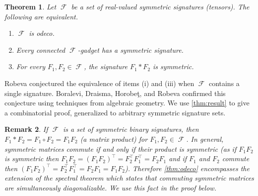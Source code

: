 \documentclass{article}
\newtheorem{theorem}{Theorem}\newtheorem{lemma}[theorem]{Lemma}\newtheorem{proposition}[theorem]{Proposition}\newtheorem{corollary}[theorem]{Corollary}\newtheorem{definition}[theorem]{Definition}\newtheorem{claim}[theorem]{Claim}\newtheorem{remark}[theorem]{Remark}\newtheorem{conjecture}[theorem]{Conjecture}
\DeclareMathOperator{\fc}{\mathcal{F}}
\begin{document}
\begin{theorem}
    \label{thm:odeco}
    Let $\fc$ be a set of real-valued symmetric signatures (tensors). The following are equivalent.
    \begin{enumerate}[label=(\roman*)]
        \item $\fc$ is odeco.
        \item Every connected $\fc$-gadget has a symmetric signature.
        \item For every $F_1,F_2 \in \fc$, the signature $F_1 * F_2$ is symmetric.
    \end{enumerate}
\end{theorem}
Robeva \cite{robeva} conjectured the equivalence of items (i) and (iii) when $\fc$
contains a single signature.
Boralevi, Draisma, Horobeţ, and Robeva \cite{boralevi_orthogonal_2017} confirmed this conjecture
using techniques from algebraic geometry.
We use \autoref{thm:result} to give a combinatorial proof, generalized to arbitrary symmetric
signature sets.
\begin{remark}
    If $\fc$ is a set of symmetric binary signatures, then $F_1 * F_2 = F_1 \circ F_2 = F_1F_2$
    (a matrix product) for $F_1,F_2 \in \fc$. In general, symmetric matrices commute if and only
    if their product is symmetric (as if $F_1F_2$ is symmetric then $F_1F_2 = (F_1F_2)^\top = F_2^\top
    F_1^\top = F_2F_1$ and if $F_1$ and $F_2$ commute then $(F_1F_2)^\top = F_2^\top F_1^\top = F_2F_1 = F_1F_2$).
    Therefore \autoref{thm:odeco} encompasses the extension of the spectral theorem
    which states that commuting symmetric matrices are simultaneously diagonalizable. We use this
    fact in the proof below.
    \label{rem:spectral}
\end{remark}
\end{document}
